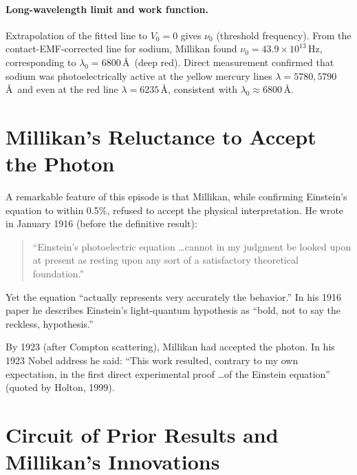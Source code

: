 \documentclass[12pt]{article}
\begin{document}
\paragraph{Long-wavelength limit and work function.}
Extrapolation of the fitted line to $V_0 = 0$ gives $\nu_0$ (threshold
frequency).  From the contact-EMF-corrected line for sodium,
Millikan found $\nu_0 = 43.9\times10^{13}$\,Hz, corresponding to
$\lambda_0 = 6800$\,\AA\ (deep red).  Direct measurement confirmed
that sodium was photoelectrically active at the yellow mercury lines
$\lambda = 5780, 5790$\,\AA\ and even at the red line $\lambda = 6235$\,\AA,
consistent with $\lambda_0 \approx 6800$\,\AA.

\section{Millikan's Reluctance to Accept the Photon}

A remarkable feature of this episode is that Millikan, while confirming
Einstein's equation to within 0.5\%, refused to accept the physical interpretation.
He wrote in January 1916 (before the definitive result):
\begin{quote}
``Einstein's photoelectric equation \ldots cannot in my judgment be looked upon
at present as resting upon any sort of a satisfactory theoretical foundation.''
\end{quote}
Yet the equation ``actually represents very accurately the behavior.''  In his
1916 paper he describes Einstein's light-quantum hypothesis as ``bold, not to
say the reckless, hypothesis.''

By 1923 (after Compton scattering), Millikan had accepted the photon.
In his 1923 Nobel address he said: ``This work resulted, contrary to my own
expectation, in the first direct experimental proof \ldots of the
Einstein equation'' (quoted by Holton, 1999).

\section{Circuit of Prior Results and Millikan's Innovations}
\end{document}
